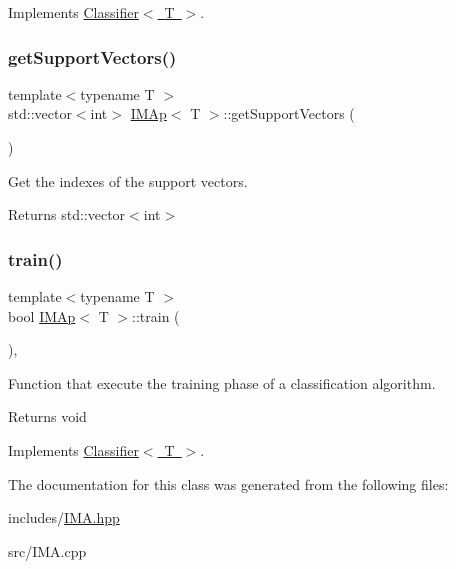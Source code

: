 Implements \mbox{\hyperlink{class_classifier_ab3b9544a8d9c3cbde8d5865c7e9be0fb}{Classifier$<$ T $>$}}.

\mbox{\label{class_i_m_ap_a87adda768f1c48c0e4fcdf66f3145ae9}} 
\subsubsection{\texorpdfstring{get\+Support\+Vectors()}{getSupportVectors()}}
{\footnotesize\ttfamily template$<$typename T $>$ \\
std\+::vector$<$int$>$ \mbox{\hyperlink{class_i_m_ap}{I\+M\+Ap}}$<$ T $>$\+::get\+Support\+Vectors (\begin{DoxyParamCaption}{ }\end{DoxyParamCaption})\hspace{0.3cm}{\ttfamily [inline]}}



Get the indexes of the support vectors. 

\begin{DoxyReturn}{Returns}
std\+::vector$<$int$>$ 
\end{DoxyReturn}
\mbox{\label{class_i_m_ap_aa8bf6b0d21a76d388fe81ee516b627e4}} 
\subsubsection{\texorpdfstring{train()}{train()}}
{\footnotesize\ttfamily template$<$typename T $>$ \\
bool \mbox{\hyperlink{class_i_m_ap}{I\+M\+Ap}}$<$ T $>$\+::train (\begin{DoxyParamCaption}{ }\end{DoxyParamCaption})\hspace{0.3cm}{\ttfamily [override]}, {\ttfamily [virtual]}}



Function that execute the training phase of a classification algorithm. 

\begin{DoxyReturn}{Returns}
void 
\end{DoxyReturn}


Implements \mbox{\hyperlink{class_classifier_a120849bfdfa3ba7a0388b32b2d76bf4f}{Classifier$<$ T $>$}}.



The documentation for this class was generated from the following files\+:\begin{DoxyCompactItemize}
\item 
includes/\mbox{\hyperlink{_i_m_a_8hpp}{I\+M\+A.\+hpp}}\item 
src/I\+M\+A.\+cpp\end{DoxyCompactItemize}
